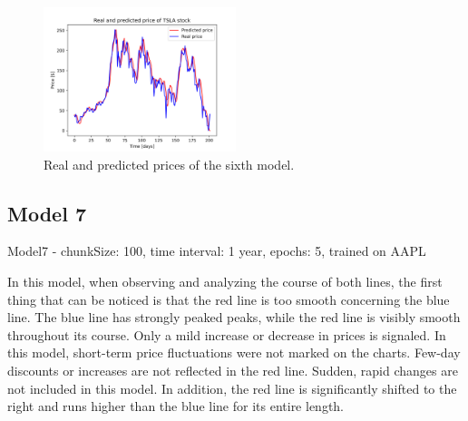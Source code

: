 \begin{figure}
\includegraphics[width=0.5\textwidth]{./graf/model6/TSLA.png}
\caption{Real and predicted prices of the sixth model.}
\label{fig:label}
\end{figure} 

\clearpage
\subsection{Model 7}

Model7 - chunkSize: 100, time interval: 1 year, epochs: 5, trained on AAPL\par\bigskip
In this model, when observing and analyzing the course of both lines, the first thing that can be
noticed is that the red line is too smooth concerning the blue line. The blue line has strongly
peaked peaks, while the red line is visibly smooth throughout its course. Only a mild increase or
decrease in prices is signaled. In this model, short-term price fluctuations were not marked on the
charts. Few-day discounts or increases are not reflected in the red line. Sudden, rapid
changes are not included in this model. In addition, the red line is significantly shifted to the right and
runs higher than the blue line for its entire length.

